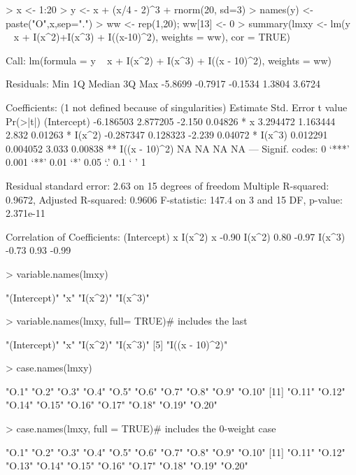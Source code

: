 \documentclass[10pt,letterpaper]{article}
\newenvironment{Schunk}{}{}
\begin{document}
\begin{Schunk}
\begin{Sinput}
> x <- 1:20
> y <-  x + (x/4 - 2)^3 + rnorm(20, sd=3)
> names(y) <- paste("O",x,sep=".")
> ww <- rep(1,20); ww[13] <- 0
> summary(lmxy <- lm(y ~ x + I(x^2)+I(x^3) + I((x-10)^2), weights = ww), cor = TRUE)
\end{Sinput}
\begin{Soutput}
Call:
lm(formula = y ~ x + I(x^2) + I(x^3) + I((x - 10)^2), weights = ww)

Residuals:
    Min      1Q  Median      3Q     Max 
-5.8699 -0.7917 -0.1534  1.3804  3.6724 

Coefficients: (1 not defined because of singularities)
               Estimate Std. Error t value Pr(>|t|)   
(Intercept)   -6.186503   2.877205  -2.150  0.04826 * 
x              3.294472   1.163444   2.832  0.01263 * 
I(x^2)        -0.287347   0.128323  -2.239  0.04072 * 
I(x^3)         0.012291   0.004052   3.033  0.00838 **
I((x - 10)^2)        NA         NA      NA       NA   
---
Signif. codes:  0 ‘***’ 0.001 ‘**’ 0.01 ‘*’ 0.05 ‘.’ 0.1 ‘ ’ 1 

Residual standard error: 2.63 on 15 degrees of freedom
Multiple R-squared: 0.9672,	Adjusted R-squared: 0.9606 
F-statistic: 147.4 on 3 and 15 DF,  p-value: 2.371e-11 

Correlation of Coefficients:
       (Intercept) x     I(x^2)
x      -0.90                   
I(x^2)  0.80       -0.97       
I(x^3) -0.73        0.93 -0.99 
\end{Soutput}
\begin{Sinput}
> variable.names(lmxy)
\end{Sinput}
\begin{Soutput}
[1] "(Intercept)" "x"           "I(x^2)"      "I(x^3)"     
\end{Soutput}
\begin{Sinput}
> variable.names(lmxy, full= TRUE)# includes the last
\end{Sinput}
\begin{Soutput}
[1] "(Intercept)"   "x"             "I(x^2)"        "I(x^3)"       
[5] "I((x - 10)^2)"
\end{Soutput}
\begin{Sinput}
> case.names(lmxy)
\end{Sinput}
\begin{Soutput}
 [1] "O.1"  "O.2"  "O.3"  "O.4"  "O.5"  "O.6"  "O.7"  "O.8"  "O.9"  "O.10"
[11] "O.11" "O.12" "O.14" "O.15" "O.16" "O.17" "O.18" "O.19" "O.20"
\end{Soutput}
\begin{Sinput}
> case.names(lmxy, full = TRUE)# includes the 0-weight case
\end{Sinput}
\begin{Soutput}
 [1] "O.1"  "O.2"  "O.3"  "O.4"  "O.5"  "O.6"  "O.7"  "O.8"  "O.9"  "O.10"
[11] "O.11" "O.12" "O.13" "O.14" "O.15" "O.16" "O.17" "O.18" "O.19" "O.20"
\end{Soutput}
\end{Schunk}
\end{document}
